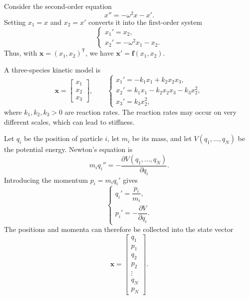 \begin{example}
  Consider the second-order equation
  \[
    x''=-\omega^2x-x'.
  \]
  Setting $x_1=x$ and $x_2=x'$ converts it into the first-order system
  \[
    \begin{cases}
      x_1'=x_2,\\
      x_2'=-\omega^2x_1-x_2.
    \end{cases}
  \]
  Thus, with $\mathbf{x}=(x_1,x_2)^{\mathsf T}$, we have
  $\mathbf{x}'=\mathbf{f}(x_1,x_2)$.
\end{example}

\begin{example}
  A three-species kinetic model is
  \[
    \mathbf{x}=
    \begin{bmatrix}
      x_1\\x_2\\x_3
    \end{bmatrix},
    \qquad
    \begin{cases}
      x_1'=-k_1x_1+k_2x_2x_3,\\
      x_2'= k_1x_1-k_2x_2x_3-k_3x_2^2,\\
      x_3'= k_3x_2^2,
    \end{cases}
  \]
  where $k_1,k_2,k_3>0$ are reaction rates. The reaction rates may occur
  on very different scales, which can lead to stiffness.
\end{example}

\begin{example}
  Let $q_i$ be the position of particle $i$, let $m_i$ be its mass, and
  let $V(q_1,\ldots,q_N)$ be the potential energy. Newton's equation is
  \[
    m_iq_i''=-\frac{\partial V(q_1,\ldots,q_N)}{\partial q_i}.
  \]
  Introducing the momentum $p_i=m_iq_i'$ gives
  \[
    \begin{cases}
      q_i'=\dfrac{p_i}{m_i},\\[6pt]
      p_i'=-\dfrac{\partial V}{\partial q_i}.
    \end{cases}
  \]
  The positions and momenta can therefore be collected into the state
  vector
  \[
    \mathbf{x}=
    \begin{bmatrix}
      q_1\\p_1\\q_2\\p_2\\\vdots\\q_N\\p_N
    \end{bmatrix}.
  \]

  \begin{center}
  \end{center}
\end{example}

